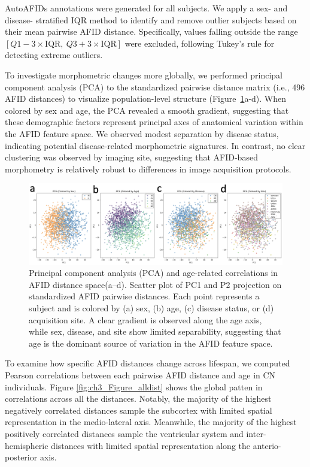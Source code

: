 AutoAFIDs annotations were generated for all subjects. We apply a sex- and disease- stratified IQR method to identify and remove outlier subjects based on their mean pairwise AFID distance. Specifically, values falling outside the range \( [Q1 - 3 \times \text{IQR},\ Q3 + 3 \times \text{IQR}] \) were excluded, following Tukey’s rule for detecting extreme outliers.

To investigate morphometric changes more globally, we performed principal component analysis (PCA) to the standardized pairwise distance matrix (i.e., 496 AFID distances) to visualize population-level structure (Figure~\ref{fig:ch3_Figure_PCA}a-d). When colored by sex and age, the PCA revealed a smooth gradient, suggesting that these demographic factors represent principal axes of anatomical variation within the AFID feature space. We observed modest separation by disease status, indicating potential disease-related morphometric signatures. In contrast, no clear clustering was observed by imaging site, suggesting that AFID-based morphometry is relatively robust to differences in image acquisition protocols.
\begin{figure}[hbt!]
    \centering
    \includegraphics[width=1\linewidth]{figs/ch3_Figure_PCA.png}
    \caption{Principal component analysis (PCA) and age-related correlations in AFID distance space(a–d). Scatter plot of PC1 and P2 projection on standardized AFID pairwise distances. Each point represents a subject and is colored by (a) sex, (b) age, (c) disease status, or (d) acquisition site. A clear gradient is observed along the age axis, while sex, disease, and site show limited separability, suggesting that age is the dominant source of variation in the AFID feature space.}
    \label{fig:ch3_Figure_PCA}
\end{figure}


To examine how specific AFID distances change across lifespan, we computed Pearson correlations between each pairwise AFID distance and age in CN individuals. Figure \ref{fig:ch3_Figure_alldist} shows the global patten in correlations across all the distances. Notably, the majority of the highest negatively correlated distances sample the subcortex with limited spatial representation in the medio-lateral axis. Meanwhile, the majority of the highest positively correlated distances sample the ventricular system and inter-hemispheric distances with limited spatial representation along the anterio-posterior axis. 

